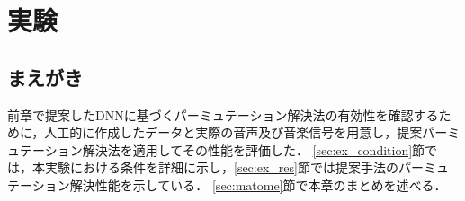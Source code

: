 \chapter{実験}
\label{chap:ex}

\section{まえがき}
前章で提案したDNNに基づくパーミュテーション解決法の有効性を確認するために，人工的に作成したデータと実際の音声及び音楽信号を用意し，提案パーミュテーション解決法を適用してその性能を評価した．
\ref{sec:ex_condition}節では，本実験における条件を詳細に示し，\ref{sec:ex_res}節では提案手法のパーミュテーション解決性能を示している．
\ref{sec:matome}節で本章のまとめを述べる．
